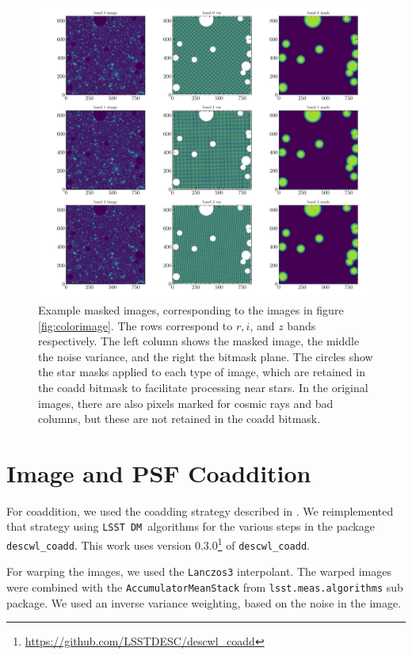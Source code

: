 \documentclass[twocolumn,twocolappendix,astrosym]{openjournal}
\newcommand{\dm}{\texttt{LSST DM}}
\begin{document}
\begin{figure}
    \includegraphics[width=\columnwidth]{example-masked-image.pdf}
    \caption{
        Example masked images, corresponding to the images in figure
        \ref{fig:colorimage}.  The rows correspond to $r, i$, and $z$ bands
        respectively.  The left column shows the masked image, the middle the
        noise variance, and the right the bitmask plane.  The circles show the
        star masks applied to each type of image, which are retained in the
        coadd bitmask to facilitate processing near stars.  In the original
        images, there are also pixels marked for cosmic rays and bad
        columns, but these are not retained in the coadd bitmask.
    }
\end{figure}



\section{Image and PSF Coaddition} \label{sec:coadding}

For coaddition, we used the coadding strategy described in
\citet{BeckerMdetCoadd}. We reimplemented that strategy using \dm\ algorithms
for the various steps in the package \texttt{descwl\_coadd}. This work uses
version 0.3.0\footnote{\url{https://github.com/LSSTDESC/descwl_coadd}} of
\texttt{descwl\_coadd}.

For warping the images, we used the \texttt{Lanczos3} interpolant. The warped images
were combined with the \texttt{AccumulatorMeanStack} from \texttt{lsst.meas.algorithms}
sub package. We used an inverse variance weighting, based on the noise in
the image.
\end{document}
